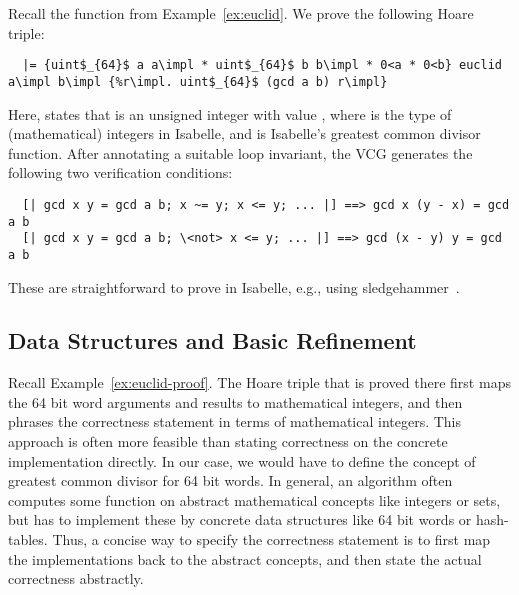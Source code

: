 \documentclass[a4paper,USenglish,cleveref, autoref]{lipics-v2019}
\begin{document}
\begin{example}\label{ex:euclid-proof}
Recall the function  from Example~\ref{ex:euclid}.
We prove the following Hoare triple:
\begin{lstlisting}
  |= {uint$_{64}$ a a\impl * uint$_{64}$ b b\impl * 0<a * 0<b} euclid a\impl b\impl {%r\impl. uint$_{64}$ (gcd a b) r\impl}
\end{lstlisting}
Here,  states that  is an unsigned integer with value , 
where  is the type of (mathematical) integers in Isabelle, and  is Isabelle's greatest common divisor function. 
After annotating a suitable loop invariant, the VCG generates the following two verification conditions:
\begin{lstlisting}
  [| gcd x y = gcd a b; x ~= y; x <= y; ... |] ==> gcd x (y - x) = gcd a b
  [| gcd x y = gcd a b; \<not> x <= y; ... |] ==> gcd (x - y) y = gcd a b
\end{lstlisting}
These are straightforward to prove in Isabelle, e.g., using sledgehammer~\cite{BBP13}.
\end{example}

\subsection{Data Structures and Basic Refinement}
Recall Example~\ref{ex:euclid-proof}. The Hoare triple that is proved there first maps the 64 bit word arguments and results to mathematical integers,
and then phrases the correctness statement in terms of mathematical integers. 
This approach is often more feasible than stating correctness on the concrete implementation directly. 
In our case, we would have to define the concept of greatest common divisor for 64 bit words. In general, an algorithm often 
computes some function on abstract mathematical concepts like integers or sets, but has to implement these by concrete data structures like 64 bit words or hash-tables.
Thus, a concise way to specify the correctness statement is to first map the implementations back to the abstract concepts, and then state 
the actual correctness abstractly. 
\end{document}
